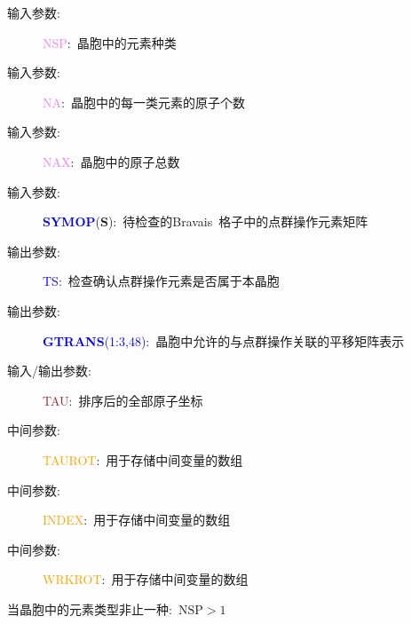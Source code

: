 \documentclass{article}      %
\begin{document}
\vskip 30pt
\begin{description}
	\item[输入参数:~]\textcolor{violet}{\textrm{NSP}}:~晶胞中的元素种类
	\item[输入参数:~]\textcolor{violet}{\textrm{NA}}:~晶胞中的每一类元素的原子个数
	\item[输入参数:~]\textcolor{violet}{\textrm{NAX}}:~晶胞中的原子总数
	\item[输入参数:~]\textcolor{blue}{\textbf{SYMOP}}(\textbf{S}):~待检查的\textrm{Bravais~}格子中的点群操作元素矩阵
	\item[输出参数:~]\textcolor{blue}{\textrm{TS}}:~检查确认点群操作元素是否属于本晶胞
	\item[输出参数:~]\textcolor{blue}{\textbf{GTRANS}(1:3,48)}:~晶胞中允许的与点群操作关联的平移矩阵表示
	\item[输入/输出参数:~]\textcolor{brown}{\textrm{TAU}}:~排序后的全部原子坐标
	\item[中间参数:~]\textcolor{orange}{\textrm{TAUROT}}:~用于存储中间变量的数组
	\item[中间参数:~]\textcolor{orange}{\textrm{INDEX}}:~用于存储中间变量的数组
	\item[中间参数:~]\textcolor{orange}{\textrm{WRKROT}}:~用于存储中间变量的数组
\end{description}
当晶胞中的元素类型非止一种:~$\mathrm{NSP}>1$
\end{document}

